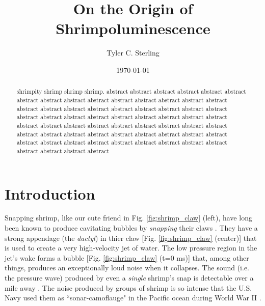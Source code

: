 \documentclass[rmp,aps,nofootinbib,superscriptaddress,floatfix]{revtex4-2}
\begin{document}
\title{On the Origin of Shrimpoluminescence}

\author{Tyler C. Sterling}

\date{\today}

\begin{abstract}
shrimpity shrimp shrimp shrimp. abstract abstract abstract abstract abstract abstract abstract abstract abstract abstract abstract abstract abstract abstract abstract abstract abstract abstract abstract abstract abstract abstract abstract abstract abstract abstract abstract abstract abstract abstract abstract abstract abstract abstract abstract abstract abstract abstract abstract abstract abstract abstract abstract abstract abstract abstract abstract abstract abstract abstract abstract abstract abstract abstract abstract abstract abstract abstract abstract abstract abstract abstract abstract abstract 
\end{abstract}

\maketitle





\section{Introduction}
Snapping shrimp, like our cute friend in Fig. \ref{fig:shrimp_claw} (left), have long been known to produce cavitating bubbles by \emph{snapping} their claws \cite{versluis2000snapping,lohse2001snapping,tang2019bioinspired}. They have a strong appendage (the \emph{dactyl}) in thier claw [Fig. \ref{fig:shrimp_claw} (center)] that is used to create a very high-velocity jet of water. The low pressure region in the jet's wake forms a bubble [Fig. \ref{fig:shrimp_claw} (t=0 ms)] that, among other things, produces an exceptionally loud noise when it collapses. The sound (i.e. the pressure wave) produced by even a \emph{single} shrimp's snap is detectable over a mile away \cite{everest1948acoustical}. The noise produced by groups of shrimp is so intense that the U.S. Navy used them as ``sonar-camoflauge" in the Pacific ocean during World War II \cite{versluis2000snapping}. 
\end{document}

